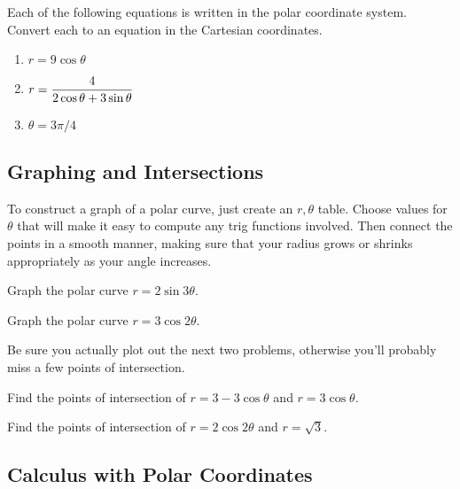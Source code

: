\begin{problem} 
%
Each of the following equations is written in the polar coordinate system.  Convert each to an equation in the Cartesian coordinates.
\begin{enumerate}
\item $r=9\cos\theta$
\item $\displaystyle r=\frac{4}{2\cos\theta+3\sin\theta}$
\item $\theta = 3\pi/4$
\end{enumerate}
\end{problem}

\subsection{Graphing and Intersections}
To construct a graph of a polar curve, just create an $r,\theta$ table. Choose values for $\theta$ that will make it easy to compute any trig functions involved. Then connect the points in a smooth manner, making sure that your radius grows or shrinks appropriately as your angle increases.  
%

\begin{problem}
Graph the polar curve $r=2\sin 3\theta$.
\end{problem}

\begin{problem}
Graph the polar curve $r=3\cos 2\theta$.
\end{problem}

Be sure you actually plot out the next two problems, otherwise you'll probably miss a few points of intersection.

\begin{problem}
Find the points of intersection of $r=3-3\cos\theta$ and $r=3\cos\theta$.
\end{problem}

\begin{problem}
Find the points of intersection of $r=2\cos 2\theta $ and $r=\sqrt 3$.
\end{problem}


\subsection{Calculus with Polar Coordinates}

